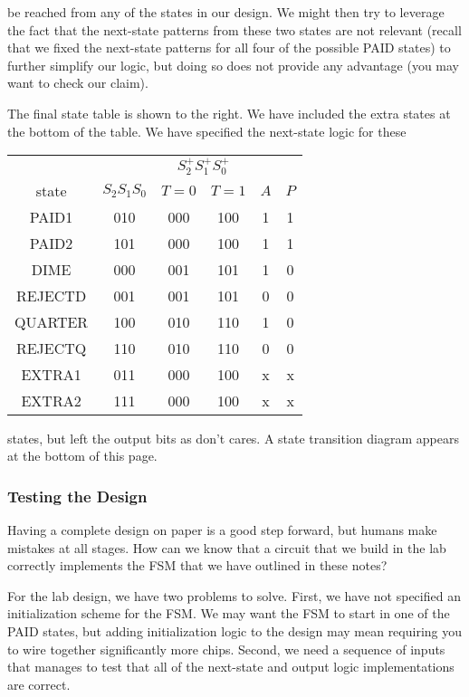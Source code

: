 \begin{minipage}{3.15in}
be reached from any of
the states in our design.  We might then try to leverage the fact
that the next-state patterns from these two states are not relevant 
(recall that we fixed the next-state patterns for all four of the 
possible PAID states) to further simplify our logic, but doing so 
does not provide any advantage (you may want to check our claim).\mpline

The final state table is shown to the right.  We have included the
extra states at the bottom of the table.  We have specified the
next-state logic for these\linebreak
\end{minipage}\hspace{0.25in}%
\begin{minipage}{3.1in}
\begin{tabular}{cc|cc|cc}
&&\multicolumn{2}{|c|}{$S_2^+S_1^+S_0^+$}\\
state& $S_2S_1S_0$& $T=0$& $T=1$& $A$& $P$\\ \hline
PAID1& 010& 000& 100& 1& 1\\
PAID2& 101& 000& 100& 1& 1\\
DIME& 000& 001& 101& 1& 0\\
REJECTD& 001& 001& 101& 0& 0\\
QUARTER& 100& 010& 110& 1& 0\\
REJECTQ& 110& 010& 110& 0& 0\\ \hline
EXTRA1& 011& 000& 100& x& x\\
EXTRA2& 111& 000& 100& x& x
\end{tabular}\vspace{12pt}
\end{minipage}\mpdone

states, but left the output bits as don't
cares.  A state transition diagram appears at the bottom of this page.\\

\subsubsection{Testing the Design}

Having a complete design on paper is a good step forward, but humans
make mistakes at all stages.  How can we know that a circuit that
we build in the lab correctly implements the FSM that we have outlined 
in these notes?

For the lab design, we have two problems to solve.
%
First, we have not specified an initialization scheme for the FSM.
We may want the FSM to start in one of the PAID states, but adding
initialization logic to the design may mean requiring you to wire together
significantly more chips.  Second, we need a sequence of inputs that
manages to test that all of the next-state and output logic implementations
are correct.

